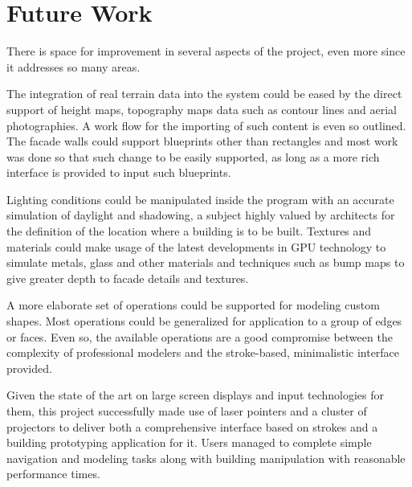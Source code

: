 
\section{Future Work}

There is space for improvement in several aspects of the project,
even more since it addresses so many areas.

The integration of real terrain data into the system could be eased by
the direct support of height maps, topography maps data such as contour lines
and aerial photographies. A work flow for the importing of such content is
even so outlined.
The facade walls could support blueprints other than rectangles and most work was
done so that such change to be easily supported, as long as a more rich
interface is provided to input such blueprints.

Lighting conditions could be manipulated inside the program with an
accurate simulation of daylight and shadowing, a subject highly valued
by architects for the definition of the location where a building is to be built.
Textures and materials could make usage of the latest developments in GPU
technology to simulate metals, glass and other materials and
techniques such as bump maps to give greater depth to facade details and textures.

A more elaborate set of operations could be supported for modeling custom shapes.
Most operations could be generalized for application to a group of edges or faces.
Even so, the available operations are a good compromise between the complexity
of professional modelers and the stroke-based, minimalistic interface provided.

Given the state of the art on large screen displays and input technologies for them,
this project successfully made use of laser pointers and a cluster of projectors
to deliver both a comprehensive interface based on strokes and a building prototyping
application for it. Users managed to complete simple navigation and modeling tasks along
with building manipulation with reasonable performance times.


